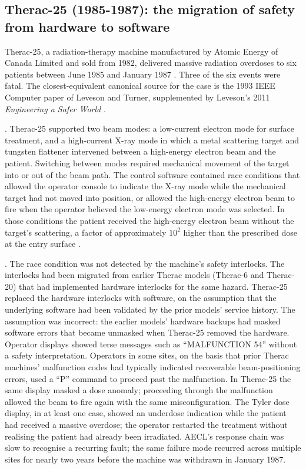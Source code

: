 \subsection{Therac-25 (1985-1987): the migration of safety from hardware to software}

Therac-25, a radiation-therapy machine manufactured by Atomic
Energy of Canada Limited and sold from 1982, delivered massive
radiation overdoses to six patients between June 1985 and January
1987 \cite{acc:therac-25-1985-1987, paper:leveson-turner1993}.
Three of the six events were fatal. The closest-equivalent
canonical source for the case is the 1993 IEEE Computer paper of
Leveson and Turner, supplemented by Leveson's 2011
\emph{Engineering a Safer World}
\cite{text:v6c12-leveson-engineering-safer-world-2011}.

. Therac-25 supported two beam
modes: a low-current electron mode for surface treatment, and a
high-current X-ray mode in which a metal scattering target and
tungsten flattener intervened between a high-energy electron beam
and the patient. Switching between modes required mechanical
movement of the target into or out of the beam path. The control
software contained race conditions that allowed the operator
console to indicate the X-ray mode while the mechanical target had
not moved into position, or allowed the high-energy electron beam
to fire when the operator believed the low-energy electron mode
was selected. In those conditions the patient received the
high-energy electron beam without the target's scattering, a
factor of approximately $10^2$ higher than the prescribed dose at
the entry surface \cite{paper:leveson-turner1993}.

. The race condition was not
detected by the machine's safety interlocks. The interlocks had
been migrated from earlier Therac models (Therac-6 and Therac-20)
that had implemented hardware interlocks for the same hazard.
Therac-25 replaced the hardware interlocks with software, on the
assumption that the underlying software had been validated by the
prior models' service history. The assumption was incorrect: the
earlier models' hardware backups had masked software errors that
became unmasked when Therac-25 removed the hardware. Operator
displays showed terse messages such as ``MALFUNCTION 54'' without a
safety interpretation. Operators in some sites, on the basis that
prior Therac machines' malfunction codes had typically indicated
recoverable beam-positioning errors, used a ``P'' command to
proceed past the malfunction. In Therac-25 the same display
masked a dose anomaly; proceeding through the malfunction allowed
the beam to fire again with the same misconfiguration. The Tyler
dose display, in at least one case, showed an underdose indication
while the patient had received a massive overdose; the operator
restarted the treatment without realising the patient had already
been irradiated. AECL's response chain was slow to recognise a
recurring fault; the same failure mode recurred across multiple
sites for nearly two years before the machine was withdrawn in
January 1987.

